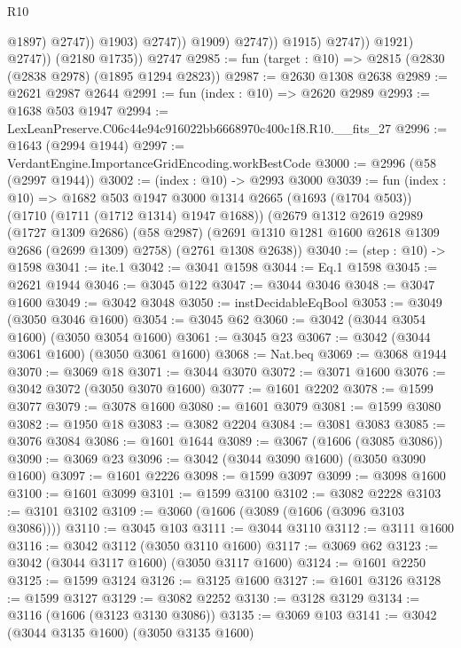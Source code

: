 \begin{lexlean}{R10}
\begin{coremodule}
                                    @1897)
                                  @2747))
                              @1903)
                            @2747))
                        @1909)
                      @2747))
                  @1915)
                @2747))
            @1921)
          @2747))
      (@2180 @1735))
    @2747
@2985 := fun (target : @10) => @2815 (@2830 (@2838 @2978) (@1895 @1294 @2823))
@2987 := @2630 @1308 @2638
@2989 := @2621 @2987 @2644
@2991 := fun (index : @10) => @2620 @2989
@2993 := @1638 @503 @1947
@2994 := LexLeanPreserve.C06c44e94c916022bb6668970c400c1f8.R10.__fits_27
@2996 := @1643 (@2994 @1944)
@2997 := VerdantEngine.ImportanceGridEncoding.workBestCode
@3000 := @2996 (@58 (@2997 @1944))
@3002 := (index : @10) -> @2993 @3000
@3039 := fun (index : @10) =>
  @1682
    @503
    @1947
    @3000
    @1314
    @2665
    (@1693 (@1704 @503))
    (@1710 (@1711 (@1712 @1314) @1947 @1688))
    (@2679
      @1312
      @2619
      @2989
      (@1727 @1309 @2686)
      (@58 @2987)
      (@2691 @1310 @1281 @1600 @2618 @1309 @2686 (@2699 @1309) @2758)
      (@2761 @1308 @2638))
@3040 := (step : @10) -> @1598
@3041 := ite.{1}
@3042 := @3041 @1598
@3044 := Eq.{1} @1598
@3045 := @2621 @1944
@3046 := @3045 @122
@3047 := @3044 @3046
@3048 := @3047 @1600
@3049 := @3042 @3048
@3050 := instDecidableEqBool
@3053 := @3049 (@3050 @3046 @1600)
@3054 := @3045 @62
@3060 := @3042 (@3044 @3054 @1600) (@3050 @3054 @1600)
@3061 := @3045 @23
@3067 := @3042 (@3044 @3061 @1600) (@3050 @3061 @1600)
@3068 := Nat.beq
@3069 := @3068 @1944
@3070 := @3069 @18
@3071 := @3044 @3070
@3072 := @3071 @1600
@3076 := @3042 @3072 (@3050 @3070 @1600)
@3077 := @1601 @2202
@3078 := @1599 @3077
@3079 := @3078 @1600
@3080 := @1601 @3079
@3081 := @1599 @3080
@3082 := @1950 @18
@3083 := @3082 @2204
@3084 := @3081 @3083
@3085 := @3076 @3084
@3086 := @1601 @1644
@3089 := @3067 (@1606 (@3085 @3086))
@3090 := @3069 @23
@3096 := @3042 (@3044 @3090 @1600) (@3050 @3090 @1600)
@3097 := @1601 @2226
@3098 := @1599 @3097
@3099 := @3098 @1600
@3100 := @1601 @3099
@3101 := @1599 @3100
@3102 := @3082 @2228
@3103 := @3101 @3102
@3109 := @3060 (@1606 (@3089 (@1606 (@3096 @3103 @3086))))
@3110 := @3045 @103
@3111 := @3044 @3110
@3112 := @3111 @1600
@3116 := @3042 @3112 (@3050 @3110 @1600)
@3117 := @3069 @62
@3123 := @3042 (@3044 @3117 @1600) (@3050 @3117 @1600)
@3124 := @1601 @2250
@3125 := @1599 @3124
@3126 := @3125 @1600
@3127 := @1601 @3126
@3128 := @1599 @3127
@3129 := @3082 @2252
@3130 := @3128 @3129
@3134 := @3116 (@1606 (@3123 @3130 @3086))
@3135 := @3069 @103
@3141 := @3042 (@3044 @3135 @1600) (@3050 @3135 @1600)

\end{coremodule}
\end{lexlean}
